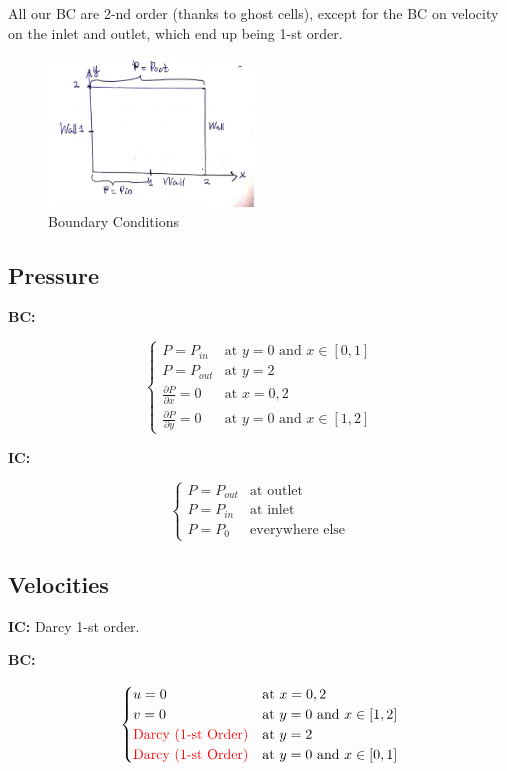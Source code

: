 \documentclass[a4paper,12pt]{article}
\begin{document}
{\color{red}All our BC are 2-nd order (thanks to ghost
    cells), except for the BC on velocity on the inlet
and outlet, which end up being 1-st order.}

\begin{figure}[H]
    \centering
    \includegraphics[width=0.5\textwidth]{img/diagram.pdf}
    \caption{Boundary Conditions}
    \label{fig:img-diagram-pdf}
\end{figure}

\subsection{Pressure}

\textbf{BC:}

\[
\begin{cases}
    P = P_{in} &\text{at } y = 0
    \text{ and } x \in [0, 1] \\
    P = P_{out} &\text{at } y = 2 \\
    \frac{\partial P}{\partial x} = 0 &\text{at }
    x = 0, 2 \\
    \frac{\partial P}{\partial y} = 0 &\text{at }
    y = 0 \text{ and } x \in [1, 2]
\end{cases}
\] 

\textbf{IC:}

\[
\begin{cases}
    P = P_{out} &\text{at outlet} \\
    P = P_{in}  &\text{at inlet} \\
    P = P_0     &\text{everywhere else}
\end{cases}
\] 

\subsection{Velocities}

\textbf{IC:} Darcy 1-st order.

\textbf{BC:}

\[
\begin{cases}
    u = 0 &\text{at } x = 0, 2 \\
    v = 0 &\text{at } y = 0 \text{ and } x \in [1, 2] \\
    {\color{red}\text{Darcy (1-st Order)}}
          &\text{at } y = 2 \\
    {\color{red}\text{Darcy (1-st Order)}}
          &\text{at } y = 0
    \text{ and } x \in [0, 1]\\
\end{cases}
\] 
\end{document}
